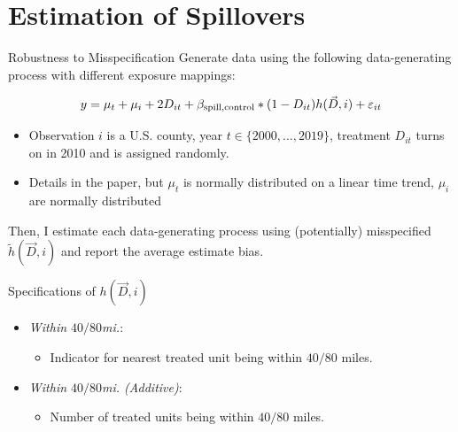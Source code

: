 \documentclass[aspectratio=169]{beamer}
\begin{document}
\section{Estimation of Spillovers}


\begin{frame}{Robustness to Misspecification}
    Generate data using the following data-generating process with different exposure mappings:

    \[ 
        y_{\it} = \mu_t + \mu_i + 2 D_{it} + \beta_{\text{spill,control}} * (1-D_{it}) h(\vec{D}, i) + \varepsilon_{it}
    \]

    \begin{itemize}
        \item Observation $i$ is a U.S. county, year $t \in \{2000, \dots, 2019\}$, treatment $D_{it}$ turns on in 2010 and is assigned randomly.
        
        \item Details in the paper, but $\mu_t$ is normally distributed on a linear time trend, $\mu_i$ are normally distributed
    \end{itemize}

    Then, I estimate each data-generating process using (potentially) misspecified $\tilde{h}(\vec{D}, i)$ and report the average estimate bias.
\end{frame}

\begin{frame}{Specifications of $h(\vec{D}, i)$}
    
    \begin{itemize}
        \item \textit{Within $40/80$mi.}:
        \begin{itemize}
            \item Indicator for nearest treated unit being within $40/80$ miles.
        \end{itemize}
        
        \item \textit{Within $40/80$mi. (Additive)}: 
        \begin{itemize}
            \item Number of treated units being within $40/80$ miles.
        \end{itemize}
        
    \end{itemize}

\end{frame}
\end{document}
